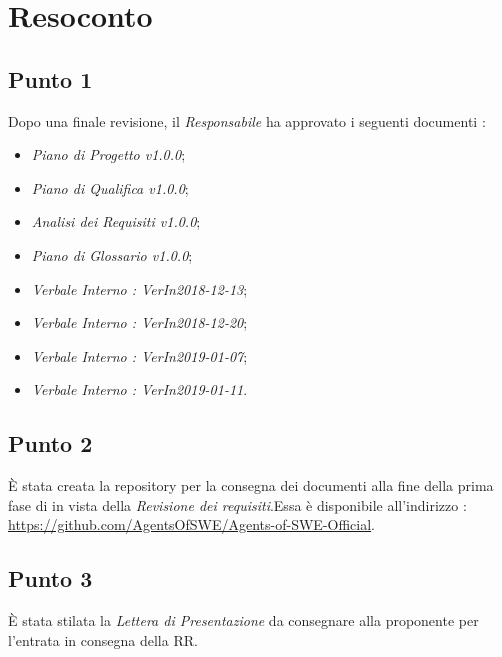 \section{Resoconto}

\subsection{Punto 1}

Dopo una finale revisione, il \textit{Responsabile} ha approvato i seguenti documenti :
\begin{itemize}
	\item \textit{Piano di Progetto v1.0.0};
	\item \textit{Piano di Qualifica v1.0.0};
	\item \textit{Analisi dei Requisiti v1.0.0};
	\item \textit{Piano di Glossario v1.0.0};
	\item \textit{Verbale Interno : VerIn2018-12-13};
	\item \textit{Verbale Interno : VerIn2018-12-20};
	\item \textit{Verbale Interno : VerIn2019-01-07};
	\item \textit{Verbale Interno : VerIn2019-01-11}.
\end{itemize}

\subsection{Punto 2}
È stata creata la repository per la consegna dei documenti alla fine della prima fase di in vista della \textit{Revisione dei requisiti}.Essa è disponibile all'indirizzo : \url{https://github.com/AgentsOfSWE/Agents-of-SWE-Official}.

\subsection{Punto 3}
È stata stilata la \textit{Lettera di Presentazione} da consegnare alla proponente per l'entrata in consegna della RR.
